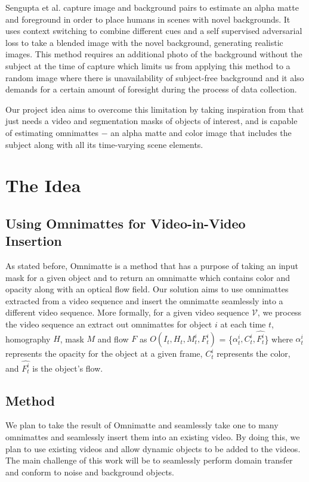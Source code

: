 \documentclass{article}
\begin{document}
Sengupta et al.\cite{BMSengupta20} capture image and background pairs to estimate an alpha matte and foreground in order to place humans in scenes with novel backgrounds. It uses context switching to combine different cues and a self supervised adversarial loss to take a blended image with the novel background, generating realistic images. This method requires an additional photo of the background without the subject at the time of capture which limits us from applying this method to a random image where there is unavailability of subject-free background and it also demands for a certain amount of foresight during the process of data collection. 

Our project idea aims to overcome this limitation\cite{BMSengupta20} by taking inspiration from\cite{lu2021} that just needs a video and segmentation masks of objects of interest, and is capable of estimating omnimattes $-$ an alpha matte and color image that includes the subject along with all its time-varying scene elements. 


\section{The Idea}

\subsection{Using Omnimattes for Video-in-Video Insertion}
As stated before, Omnimatte is a method that has a purpose of taking an input mask for a given object and to return an omnimatte which contains color and opacity along with an optical flow field. Our solution aims to use omnimattes extracted from a video sequence and insert the omnimatte seamlessly into a different video sequence. More formally, for a given video sequence $\mathcal{V}$, we process the video sequence an extract out omnimattes for object $i$ at each time $t$, homography $H$, mask $M$ and flow $F$ as $O(I_t, H_t, M_t^i, F_t^i)$ = \{$\alpha_t^i, C_t^i, \hat{F_t^i}$\} where $\alpha_t^i$ represents the opacity for the object at a given frame, $C_t^i$ represents the color, and $\hat{F_t^i}$ is the object's flow.

\subsection{Method}
We plan to take the result of Omnimatte and seamlessly take one to many omnimattes and seamlessly insert them into an existing video. By doing this, we plan to use existing videos and allow dynamic objects to be added to the videos. The main challenge of this work will be to seamlessly perform domain transfer and conform to noise and background objects.
\end{document}
